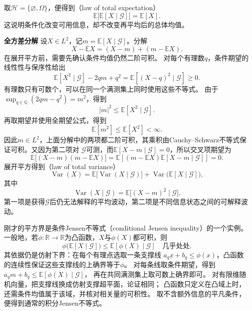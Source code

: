 取\(\mathcal{H}=\{\varnothing,\Omega\}\)，便得到（law of total expectation）
\begin{equation}
  \mathbb{E}\bigl[\mathbb{E}[X\mid\mathcal{G}]\bigr]
  =
  \mathbb{E}[X].
  \label{eq:probability-total-expectation}
\end{equation}
这说明条件化改变可用信息，却不改变再平均后的总体均值。

\par\medskip\noindent\textbf{全方差分解}\quad
设\(X\in L^2\)，记\(m=\mathbb{E}[X\mid\mathcal{G}]\)。分解
\[ X-\mathbb{E}X=(X-m)+(m-\mathbb{E}X). \]
在展开平方前，需要先确认条件均值仍然二阶可积。
对每个有理数\(q\)，条件期望的线性性与保序性给出
\[
 \mathbb E[X^2\mid\mathcal G]-2qm+q^2
 =\mathbb E[(X-q)^2\mid\mathcal G]\geq0.
\]
有理数只有可数个，可以在同一个满测集上同时使用这些不等式。
由于\(\sup_{q\in\mathbb Q}(2qm-q^2)=m^2\)，得到
\[
  |m|^2
  \leq
  \mathbb{E}[X^2\mid\mathcal{G}].
\]
再取期望并使用全期望公式，得到
\[
  \mathbb{E}[m^2]\leq\mathbb{E}[X^2]<\infty.
\]
因此\(m\in L^2\)，上面分解中的两项都二阶可积，其乘积由Cauchy--Schwarz不等式保证可积。又因为第二项对
\(\mathcal{G}\)可测，而\(\mathbb{E}[X-m\mid\mathcal{G}]=0\)，所以交叉项期望为
\[ \mathbb{E}\bigl[(X-m)(m-\mathbb{E}X)\bigr]
  =\mathbb{E}\left[(m-\mathbb{E}X)\mathbb{E}[X-m\mid\mathcal{G}]\right]=0. \]
展开平方得到（law of total variance）
\begin{equation}
  \operatorname{Var}(X)
  =
  \mathbb{E}\bigl[\operatorname{Var}(X\mid\mathcal{G})\bigr]
  +
  \operatorname{Var}\bigl(\mathbb{E}[X\mid\mathcal{G}]\bigr),
  \label{eq:probability-total-variance}
\end{equation}
其中
\[ \operatorname{Var}(X\mid\mathcal{G})
  =\mathbb{E}\bigl[(X-m)^2\mid\mathcal{G}\bigr]. \]
第一项是获得\(\mathcal{G}\)后仍无法解释的平均波动，第二项是不同信息状态之间的可解释波动。

刚才的平方界是条件Jensen不等式（conditional Jensen inequality）的一个实例。
一般地，若\(\phi:\mathbb R\to\mathbb R\)为凸函数，\(X\)与\(\phi(X)\)都可积，则
\[
 \phi\bigl(\mathbb E[X\mid\mathcal G]\bigr)
 \leq\mathbb E[\phi(X)\mid\mathcal G]\quad\text{几乎处处}.
\]
其依据仍是仿射下界：在每个有理点选取一条支撑线
\(a_qx+b_q\leq\phi(x)\)，凸函数的连续性保证这些支撑线的上确界等于\(\phi\)。
对每条线取条件期望，得到
\(a_qm+b_q\leq\mathbb E[\phi(X)\mid\mathcal G]\)，
再在共同满测集上取可数上确界即可。
对有限维随机向量，把支撑线换成仿射支撑超平面，论证相同；
凸函数只定义在凸域上时，还需条件均值属于该域，并核对相关量的可积性。
取不含额外信息的平凡条件，便得到通常的积分Jensen不等式。

